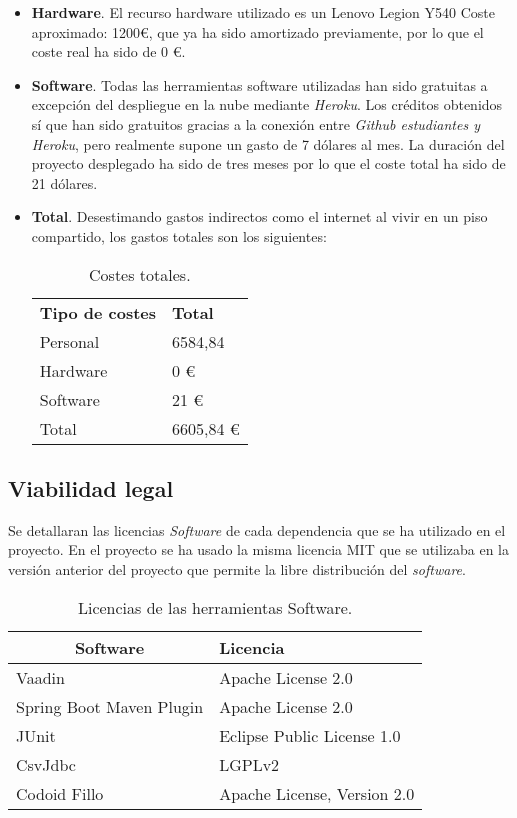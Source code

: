 \begin{itemize}
\item \textbf{Hardware}.
El recurso hardware utilizado es un Lenovo Legion Y540 Coste aproximado: 1200€, que ya ha sido amortizado previamente, por lo que el coste real ha sido de 0 €.
 
\item \textbf{Software}.
Todas las herramientas software utilizadas han sido gratuitas a excepción del despliegue en la nube mediante \emph{Heroku}. Los créditos obtenidos sí que han sido gratuitos gracias a la conexión entre \emph{Github estudiantes y Heroku}, pero realmente supone un gasto de 7 dólares al mes.
La duración del proyecto desplegado ha sido de tres meses por lo que el coste total ha sido de 21 dólares.

 
\item \textbf{Total}.
Desestimando gastos indirectos como el internet al vivir en un piso compartido, los gastos totales son los siguientes:

\begin{table}[]
	\label{Costes totales}
	\centering
	\begin{tabular}{|l|l|}
		\hline
		\multicolumn{1}{|c|}{\textbf{Tipo de costes}}     & \textbf{Total} \\
		Personal &  6584,84\\ 
		Hardware & 0 € \\
		Software & 21 € \\	\hline
		Total & 6605,84 € \\\hline
	\end{tabular}
	\caption{Costes totales.}
\end{table}

\end{itemize}

\subsection{Viabilidad legal}
Se detallaran las licencias \emph{Software} de cada dependencia que se ha utilizado en el proyecto. En el proyecto se ha usado la misma licencia MIT que se utilizaba en la versión anterior del proyecto que permite la libre distribución del \emph{software}.

\begin{table}[]
	\label{Dependencias del proyecto}
	\centering
	\begin{tabular}{|l|l|}
		\hline
		\multicolumn{1}{|c|}{\textbf{Software}}     & \textbf{Licencia} \\ \hline
		Vaadin & Apache License 2.0 \\ \hline
		Spring Boot Maven Plugin & Apache License 2.0 \\ \hline
		JUnit & Eclipse Public License 1.0 \\	\hline
		CsvJdbc & LGPLv2 \\ \hline
		Codoid Fillo & Apache License, Version 2.0 \\ \hline
	\end{tabular}
	\caption{Licencias de las herramientas Software.}
\end{table}

